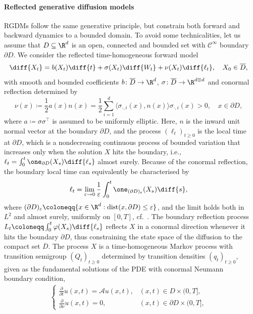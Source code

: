 \documentclass[a4paper, 11pt, headings = small, abstract]{scrartcl}
\begin{document}
\paragraph{Reflected generative diffusion models}
RGDMs follow the same generative principle, but constrain both forward and backward dynamics to a bounded domain. To avoid some technicalities, let us assume that $D\subseteq\R^d$ is an open, connected and bounded set with $\mathcal{C}^\infty$ boundary $\partial D$. We consider the reflected time-homogeneous forward model 
\[\diff{X_t}  = b(X_t) \diff{t} + \sigma(X_t) \diff{W_t} + \nu(X_t) \diff{\ell_t}, \quad X_0 \in \overline{D},\] 
with smooth and bounded coefficients $b\colon \overline{D} \to \R^d$, $\sigma\colon \overline{D} \to \R^{d \otimes d}$ and conormal reflection determined by 
\[\nu(x) \coloneqq \frac{1}{2}a(x)n(x) = \frac{1}{2}\sum_{i=1}^d \langle \sigma_{\cdot,i}(x), n(x) \rangle \sigma_{\cdot,i}(x) > 0, \quad x \in \partial D,\]
where $a \coloneq \sigma\sigma^\top$ is assumed to be uniformly elliptic. 
Here, $n$ is the inward unit normal vector at the boundary $\partial D$, and the process $(\ell_t)_{t \geq 0}$ is the local time at $\partial D$, which is a nondecreasing continuous process of bounded variation that increases only when the solution $X$ hits the boundary, i.e., $\ell_t = \int_0^t \one_{\partial D}(X_s) \diff{\ell_s}$ almost surely. Because of the conormal reflection, the boundary local time can equivalently be characterised by 
\begin{equation}\label{eq:occ}
\ell_t = \lim_{\varepsilon \to 0} \frac{1}{\varepsilon} \int_0^t \one_{(\partial D)_{\varepsilon}}(X_s) \diff{s},
\end{equation}
where $(\partial D)_{\varepsilon} \coloneqq \{x \in \R^d: \operatorname{dist}(x,\partial D) \leq \varepsilon \}$, and the limit holds both in $L^2$ and almost surely, uniformly on $[0,T]$, cf.\ \cite[Proposition 1.3]{cattiaux88}. 
The boundary reflection process $L_t \coloneqq \int_0^t \varphi(X_s) \diff{\ell_s}$ reflects $X$ in a conormal direction whenever it hits the boundary $\partial D$, thus constraining the state space of the diffusion to the compact set $\overline{D}$. 
The process $X$ is a time-homogeneous Markov process with transition semigroup $(Q_t)_{t \geq 0}$ determined by transition densities $(q_t)_{t \geq 0}$, given as the fundamental solutions of the PDE with conormal Neumann boundary condition,
\begin{align*} 
\begin{cases}
\frac{\partial}{\partial t} u(x,t) = \mathcal{A} u(x,t), &(x,t) \in D \times (0,T] ,\\
\frac{\partial}{\partial \nu} u(x,t) = 0, &(x,t) \in \partial D \times (0,T],
\end{cases}
\end{align*} 
\end{document}
